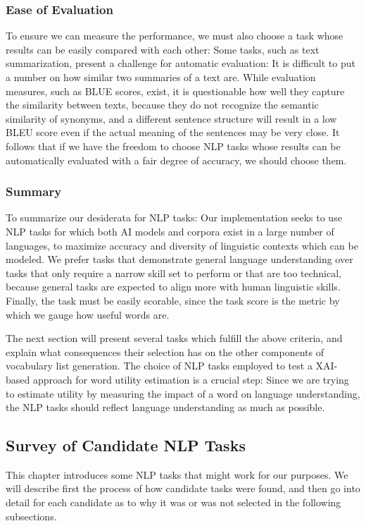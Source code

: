 \subsubsection{Ease of Evaluation}
To ensure we can measure the performance, we must also choose a task whose results can be easily compared with each other:
Some tasks, such as text summarization, present a challenge for automatic evaluation:
It is difficult to put a number on how similar two summaries of a text are.
While evaluation measures, such as BLUE scores, exist, it is questionable how well they capture the similarity between texts, because they do not recognize the semantic similarity of synonyms, and a different sentence structure will result in a low BLEU score even if the actual meaning of the sentences may be very close.
It follows that if we have the freedom to choose NLP tasks whose results can be automatically evaluated with a fair degree of accuracy, we should choose them.


\subsubsection{Summary}
To summarize our desiderata for NLP tasks:
Our implementation seeks to use NLP tasks for which both AI models and corpora exist in a large number of languages, to maximize accuracy and diversity of linguistic contexts which can be modeled.
We prefer tasks that demonstrate general language understanding over tasks that only require a narrow skill set to perform or that are too technical, because general tasks are expected to align more with human linguistic skills.
Finally, the task must be easily scorable, since the task score is the metric by which we gauge how useful words are.

The next section will present several tasks which fulfill the above criteria, and explain what consequences their selection has on the other components of vocabulary list generation.
The choice of NLP tasks employed to test a XAI-based approach for word utility estimation is a crucial step:
Since we are trying to estimate utility by measuring the impact of a word on language understanding, the NLP tasks should reflect language understanding as much as possible.

\subsection{Survey of Candidate NLP Tasks}
This chapter introduces some NLP tasks that might work for our purposes.
We will describe first the process of how candidate tasks were found, and then go into detail for each candidate as to why it was or was not selected in the following subsections.

